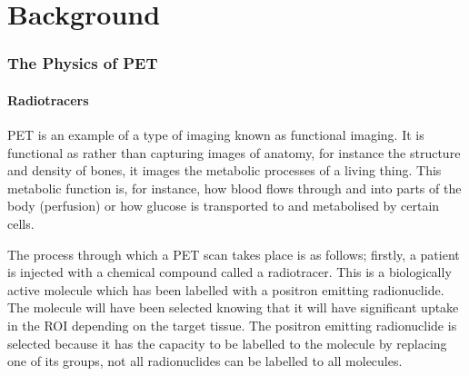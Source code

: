 \chapter{Background} \label{sec:background}
    
    
        
        
        \subsection{The Physics of PET} \label{sec:the_physics_of_pet}
            
            \subsubsection{Radiotracers} \label{sec:radiotracers}
                \gls{PET} is an example of a type of imaging known as functional imaging. It is functional as rather than capturing images of anatomy, for instance the structure and density of bones, it images the metabolic processes of a living thing. This metabolic function is, for instance, how blood flows through and into parts of the body (perfusion) or how glucose is transported to and metabolised by certain cells.

                The process through which a \gls{PET} scan takes place is as follows; firstly, a patient is injected with a chemical compound called a radiotracer. This is a biologically active molecule which has been labelled with a positron emitting radionuclide. The molecule will have been selected knowing that it will have significant uptake in the \gls{ROI} depending on the target tissue. %
                The positron emitting radionuclide is selected because it has the capacity to be labelled to the molecule by replacing one of its groups, not all radionuclides can be labelled to all molecules. %
                
